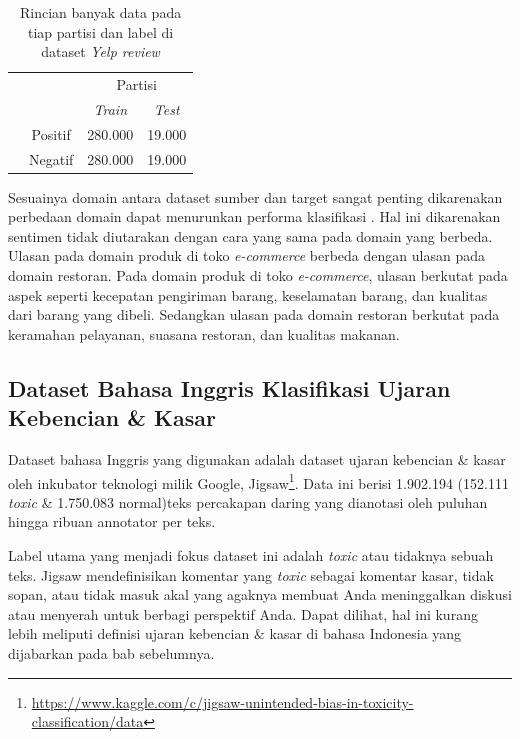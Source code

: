 	\begin{table}[ht]
	    \centering
	    \caption{Rincian banyak data pada tiap partisi dan label di dataset \textit{Yelp review}}
	    \begin{tabular}{@{}cc|cc@{}}
	    \multicolumn{1}{c}{} &\multicolumn{1}{c}{} &\multicolumn{2}{c}{Partisi} \\ 
	    \multicolumn{1}{c}{} & 
	    \multicolumn{1}{c|}{} & 
	    \multicolumn{1}{c}{\textit{Train}} & 
	    \multicolumn{1}{c}{\textit{Test}} \\ 
	    \cline{2-4}
	    \multirow[c]{2}{*}{\rotatebox[origin=tr]{90}{Label}}
	    & Positif  & 280.000 & 19.000   \\[1.5ex]
	    & Negatif  & 280.000 & 19.000   \\ 
	    \cline{2-4}
	    \end{tabular}
	    \label{tab:detail_yelp_review}
	\end{table}

	Sesuainya domain antara dataset sumber dan target sangat penting dikarenakan perbedaan domain dapat menurunkan performa klasifikasi \parencite{Lai_Oguz_Yang_Stoyanov_2019}. Hal ini dikarenakan sentimen tidak diutarakan dengan cara yang sama pada domain yang berbeda. Ulasan pada domain produk di toko \textit{e-commerce} berbeda dengan ulasan pada domain restoran. Pada domain produk di toko \textit{e-commerce}, ulasan berkutat pada aspek seperti kecepatan pengiriman barang, keselamatan barang, dan kualitas dari barang yang dibeli. Sedangkan ulasan pada domain restoran berkutat pada keramahan pelayanan, suasana restoran, dan kualitas makanan.
	
	\subsection{Dataset Bahasa Inggris Klasifikasi Ujaran Kebencian \& Kasar}
	Dataset bahasa Inggris yang digunakan adalah dataset ujaran kebencian \& kasar oleh inkubator teknologi milik Google, Jigsaw\footnote{\url{https://www.kaggle.com/c/jigsaw-unintended-bias-in-toxicity-classification/data}}. Data ini berisi 1.902.194 (152.111 \textit{toxic} \& 1.750.083 normal)teks percakapan daring yang dianotasi oleh puluhan hingga ribuan annotator per teks. 

	Label utama yang menjadi fokus dataset ini adalah \textit{toxic} atau tidaknya sebuah teks. Jigsaw mendefinisikan komentar yang \textit{toxic} sebagai komentar kasar, tidak sopan, atau tidak masuk akal yang agaknya membuat Anda meninggalkan diskusi atau menyerah untuk berbagi perspektif Anda. Dapat dilihat, hal ini kurang lebih meliputi definisi ujaran kebencian \& kasar di bahasa Indonesia yang dijabarkan pada bab sebelumnya.

